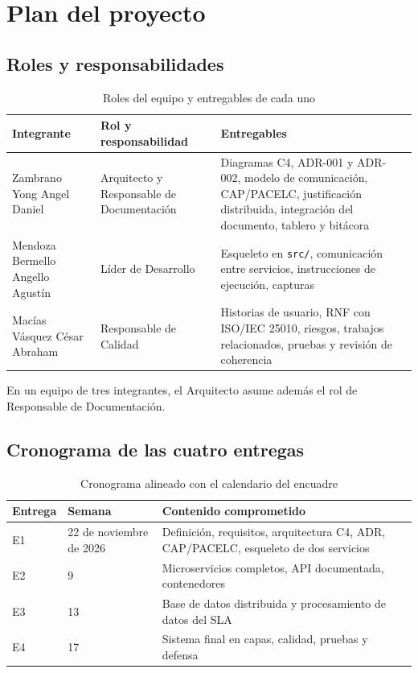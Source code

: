 ﻿\section{Plan del proyecto}

\subsection{Roles y responsabilidades}

\begin{table}[H]
\centering
\caption{Roles del equipo y entregables de cada uno}
\label{tab:roles}
\small
\begin{tabularx}{\linewidth}{@{}lYY@{}}
\toprule
Integrante & Rol y responsabilidad & Entregables \\
\midrule
Zambrano Yong Angel Daniel & Arquitecto y Responsable de Documentación & Diagramas C4, ADR-001 y
ADR-002, modelo de comunicación, CAP/PACELC, justificación distribuida, integración del documento,
tablero y bitácora \\
\addlinespace
Mendoza Bermello Angello Agustín & Líder de Desarrollo & Esqueleto en \texttt{src/}, comunicación
entre servicios, instrucciones de ejecución, capturas \\
\addlinespace
Macías Vásquez César Abraham & Responsable de Calidad & Historias de usuario, RNF con ISO/IEC 25010,
riesgos, trabajos relacionados, pruebas y revisión de coherencia \\
\bottomrule
\end{tabularx}
\end{table}

En un equipo de tres integrantes, el Arquitecto asume además el rol de Responsable de
Documentación.

\subsection{Cronograma de las cuatro entregas}

\begin{table}[H]
\centering
\caption{Cronograma alineado con el calendario del encuadre}
\label{tab:cronograma}
\small
\begin{tabularx}{\linewidth}{@{}llY@{}}
\toprule
Entrega & Semana & Contenido comprometido \\
\midrule
E1 & 22 de noviembre de 2026 & Definición, requisitos, arquitectura C4, ADR, CAP/PACELC,
esqueleto de dos servicios \\
\addlinespace
E2 & 9 & Microservicios completos, API documentada, contenedores \\
\addlinespace
E3 & 13 & Base de datos distribuida y procesamiento de datos del SLA \\
\addlinespace
E4 & 17 & Sistema final en capas, calidad, pruebas y defensa \\
\bottomrule
\end{tabularx}
\end{table}

